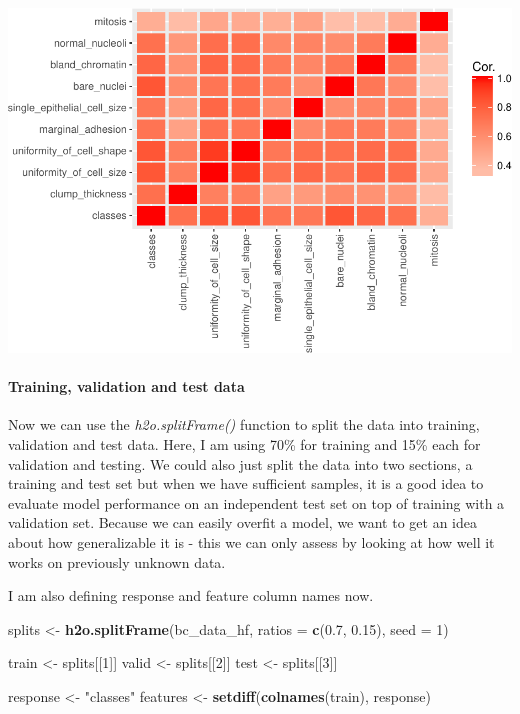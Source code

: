 \documentclass[]{article}
\newenvironment{Shaded}{\begin{snugshade}}{\end{snugshade}}
\newcommand{\KeywordTok}[1]{\textcolor[rgb]{0.13,0.29,0.53}{\textbf{{#1}}}}
\newcommand{\DataTypeTok}[1]{\textcolor[rgb]{0.13,0.29,0.53}{{#1}}}
\newcommand{\DecValTok}[1]{\textcolor[rgb]{0.00,0.00,0.81}{{#1}}}
\newcommand{\FloatTok}[1]{\textcolor[rgb]{0.00,0.00,0.81}{{#1}}}
\newcommand{\StringTok}[1]{\textcolor[rgb]{0.31,0.60,0.02}{{#1}}}
\newcommand{\NormalTok}[1]{{#1}}
\let\oldparagraph\paragraph
\renewcommand{\paragraph}[1]{\oldparagraph{#1}\mbox{}}
\begin{document}
\includegraphics{webinar_code_files/figure-latex/corr_plot-1.pdf}

\paragraph{Training, validation and test
data}\label{training-validation-and-test-data-1}

Now we can use the \emph{h2o.splitFrame()} function to split the data
into training, validation and test data. Here, I am using 70\% for
training and 15\% each for validation and testing. We could also just
split the data into two sections, a training and test set but when we
have sufficient samples, it is a good idea to evaluate model performance
on an independent test set on top of training with a validation set.
Because we can easily overfit a model, we want to get an idea about how
generalizable it is - this we can only assess by looking at how well it
works on previously unknown data.

I am also defining response and feature column names now.

\begin{Shaded}
\begin{Highlighting}[]
\NormalTok{splits <-}\StringTok{ }\KeywordTok{h2o.splitFrame}\NormalTok{(bc_data_hf, }
                         \DataTypeTok{ratios =} \KeywordTok{c}\NormalTok{(}\FloatTok{0.7}\NormalTok{, }\FloatTok{0.15}\NormalTok{), }
                         \DataTypeTok{seed =} \DecValTok{1}\NormalTok{)}

\NormalTok{train <-}\StringTok{ }\NormalTok{splits[[}\DecValTok{1}\NormalTok{]]}
\NormalTok{valid <-}\StringTok{ }\NormalTok{splits[[}\DecValTok{2}\NormalTok{]]}
\NormalTok{test <-}\StringTok{ }\NormalTok{splits[[}\DecValTok{3}\NormalTok{]]}

\NormalTok{response <-}\StringTok{ "classes"}
\NormalTok{features <-}\StringTok{ }\KeywordTok{setdiff}\NormalTok{(}\KeywordTok{colnames}\NormalTok{(train), response)}
\end{Highlighting}
\end{Shaded}
\end{document}
